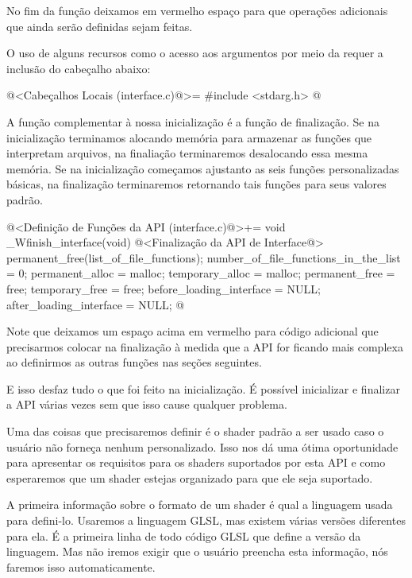 No fim da função deixamos em vermelho espaço para que operações
adicionais que ainda serão definidas sejam feitas.

O uso de alguns recursos como o acesso aos argumentos por meio da
 requer a inclusão do cabeçalho abaixo:

\iniciocodigo
@<Cabeçalhos Locais (interface.c)@>=
#include <stdarg.h>
@
\fimcodigo


A função complementar à nossa inicialização é a função de
finalização. Se na inicialização terminamos alocando memória para
armazenar as funções que interpretam arquivos, na finaliação
terminaremos desalocando essa mesma memória. Se na inicialização
começamos ajustanto as seis funções personalizadas básicas, na
finalização terminaremos retornando tais funções para seus valores
padrão.

\iniciocodigo
@<Definição de Funções da API (interface.c)@>+=
void _Wfinish_interface(void){
  @<Finalização da API de Interface@>
  permanent_free(list_of_file_functions);
  number_of_file_functions_in_the_list = 0;
  permanent_alloc = malloc;
  temporary_alloc = malloc;
  permanent_free = free;
  temporary_free = free;
  before_loading_interface = NULL;
  after_loading_interface = NULL;
}
@
\fimcodigo

Note que deixamos um espaço acima em vermelho para código adicional
que precisarmos colocar na finalização à medida que a API for ficando
mais complexa ao definirmos as outras funções nas seções seguintes.

E isso desfaz tudo o que foi feito na inicialização. É possível
inicializar e finalizar a API várias vezes sem que isso cause qualquer
problema.


Uma das coisas que precisaremos definir é o shader padrão a ser usado
caso o usuário não forneça nenhum personalizado. Isso nos dá uma ótima
oportunidade para apresentar os requisitos para os shaders suportados
por esta API e como esperaremos que um shader estejas organizado para
que ele seja suportado.

A primeira informação sobre o formato de um shader é qual a linguagem
usada para defini-lo. Usaremos a linguagem GLSL, mas existem várias
versões diferentes para ela. É a primeira linha de todo código GLSL
que define a versão da linguagem. Mas não iremos exigir que o usuário
preencha esta informação, nós faremos isso automaticamente.

